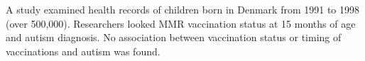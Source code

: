 \documentclass{article}
\begin{document}
\begin{flushleft}
\begin{enumalpha}
\item 
\item A study examined health records of children born in Denmark from 1991 to 1998 (over 500,000). Researchers looked MMR vaccination status at 15 months of age and autism diagnosis. No association between vaccination status or timing of vaccinations and autism was found.\\ \medskip
{}

\end{enumalpha} 
\end{flushleft}
\end{document}
